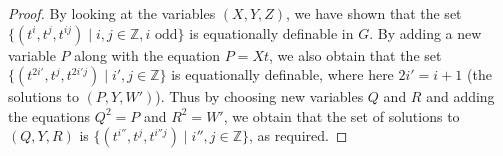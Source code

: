\documentclass[11pt]{amsart}
\theoremstyle{definition}
\numberwithin{theorem}{section}
\newcommand{\Z}{\mathbb{Z}}
\begin{document}
\begin{proof}
		By looking at the variables \((X, Y, Z)\), we have shown that the set
		\(\{(t^i, t^j, t^{ij}) \mid i, j \in \Z, i \textrm{ odd}\}\) is
		equationally definable in \(G\).  By adding a new variable \(P\) along
		with the equation \(P = Xt\), we also obtain that the set \(\{(t^{2i'},
		t^j, t^{2i'j}) \mid i', j \in \Z\}\) is equationally definable, where
		here \(2i' = i + 1\) (the solutions to \((P, Y, W')\)).  Thus by
		choosing new variables \(Q\) and \(R\) and adding the equations \(Q^2 =
		P\) and \(R^2 = W'\), we obtain that the set of solutions to \((Q, Y,
		R)\) is \(\{(t^{i''}, t^j, t^{i''j}) \mid i'', j \in \Z\}\), as
		required.
\end{proof}

 

\end{document}
